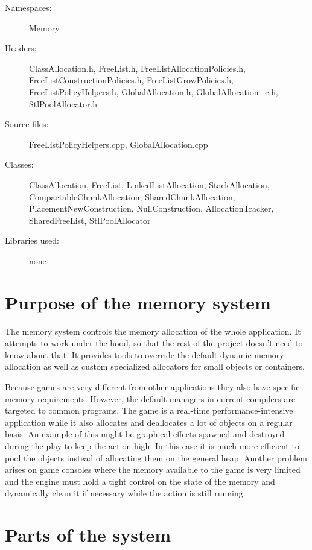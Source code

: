 \begin{description}
  \item[Namespaces:] Memory
  \item[Headers:] ClassAllocation.h, FreeList.h, FreeListAllocationPolicies.h, Free\-List\-Construction\-Policies.h, FreeListGrowPolicies.h, Free\-List\-Policy\-Hel\-pers\-.h, GlobalAllocation.h, GlobalAllocation\_c.h, StlPoolAllocator.h
  \item[Source files:] FreeListPolicyHelpers.cpp, GlobalAllocation.cpp
  \item[Classes:] ClassAllocation, FreeList, LinkedListAllocation, Stack\-Allocation, CompactableChunkAllocation, SharedChunkAllocation, Placement\-New\-Construction, NullConstruction, AllocationTracker, Shared\-Free\-List, Stl\-Pool\-Allocator
  \item[Libraries used:] none
\end{description}


\section{Purpose of the memory system}
The memory system controls the memory allocation of the whole application. It attempts to work under the hood, so that the rest of the project doesn't need to know about that. It provides tools to override the default dynamic memory allocation as well as custom specialized allocators for small objects or containers.

Because games are very different from other applications they also have specific memory requirements. However, the default managers in current compilers are targeted to common programs. The game is a real-time performance-intensive application while it also allocates and deallocates a lot of objects on a regular basis. An example of this might be graphical effects spawned and destroyed during the play to keep the action high. In this case it is much more efficient to pool the objects instead of allocating them on the general heap. Another problem arises on game consoles where the memory available to the game is very limited and the engine must hold a tight control on the state of the memory and dynamically clean it if necessary while the action is still running.



\section{Parts of the system}


